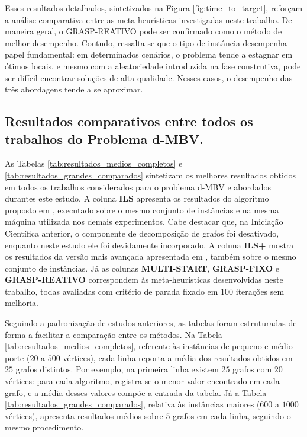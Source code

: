 Esses resultados detalhados, sintetizados na Figura \ref{fig:time_to_target}, reforçam a análise comparativa entre as meta-heurísticas investigadas neste trabalho. De maneira geral, o GRASP-REATIVO pode ser confirmado como o método de melhor desempenho. Contudo, ressalta-se que o tipo de instância desempenha papel fundamental: em determinados cenários, o problema tende a estagnar em ótimos locais, e mesmo com a aleatoriedade introduzida na fase construtiva, pode ser difícil encontrar soluções de alta qualidade. Nesses casos, o desempenho das três abordagens tende a se aproximar.




\subsection{Resultados comparativos entre todos os trabalhos do Problema d-MBV.}

As Tabelas \ref{tab:resultados_medios_completos} e \ref{tab:resultados_grandes_comparados} sintetizam os melhores resultados obtidos em todos os trabalhos considerados para o problema d-MBV e abordados durantes este estudo. A coluna \textbf{ILS} apresenta os resultados do algoritmo proposto em \cite{morenotese:2018}, executado sobre o mesmo conjunto de instâncias e na mesma máquina utilizada nos demais experimentos. Cabe destacar que, na Iniciação Científica anterior, o componente de decomposição de grafos foi desativado, enquanto neste estudo ele foi devidamente incorporado. A coluna \textbf{ILS+} mostra os resultados da versão mais avançada apresentada em \cite{silva2024ils}, também sobre o mesmo conjunto de instâncias. Já as colunas \textbf{MULTI-START}, \textbf{GRASP-FIXO} e \textbf{GRASP-REATIVO} correspondem às meta-heurísticas desenvolvidas neste trabalho, todas avaliadas com critério de parada fixado em 100 iterações sem melhoria.

Seguindo a padronização de estudos anteriores, as tabelas foram estruturadas de forma a facilitar a comparação entre os métodos. Na Tabela \ref{tab:resultados_medios_completos}, referente às instâncias de pequeno e médio porte ($20$ a $500$ vértices), cada linha reporta a média dos resultados obtidos em $25$ grafos distintos. Por exemplo, na primeira linha existem $25$ grafos com $20$ vértices: para cada algoritmo, registra-se o menor valor encontrado em cada grafo, e a média desses valores compõe a entrada da tabela. Já a Tabela \ref{tab:resultados_grandes_comparados}, relativa às instâncias maiores ($600$ a $1000$ vértices), apresenta resultados médios sobre $5$ grafos em cada linha, seguindo o mesmo procedimento.

